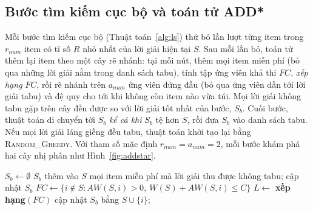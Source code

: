 \subsection{Bước tìm kiếm cục bộ và toán tử ADD*}

Mỗi bước tìm kiếm cục bộ (Thuật toán~\ref{alg:ls}) thử bỏ lần lượt từng item trong $r_{num}$ item có tỉ số $R$ nhỏ nhất của lời giải hiện tại $S$. Sau mỗi lần bỏ, toán tử \addstar thêm lại item theo một cây rẽ nhánh: tại mỗi nút, \addstar thêm mọi item miễn phí (bỏ qua những lời giải nằm trong danh sách tabu), tính tập ứng viên khả thi $FC$, \emph{xếp hạng} $FC$, rồi rẽ nhánh trên $a_{num}$ ứng viên đứng đầu (bỏ qua ứng viên dẫn tới lời giải tabu) và đệ quy cho tới khi không còn item nào vừa túi. Mọi lời giải không tabu gặp trên cây đều được so với lời giải tốt nhất của bước, $S_b$. Cuối bước, thuật toán di chuyển tới $S_b$ \emph{kể cả khi} $S_b$ tệ hơn $S$, rồi đưa $S_b$ vào danh sách tabu. Nếu mọi lời giải láng giềng đều tabu, thuật toán khởi tạo lại bằng \textsc{Random\_Greedy}. Với tham số mặc định $r_{num}=a_{num}=2$, mỗi bước khám phá hai cây nhị phân như Hình~\ref{fig:addstar}.

\begin{algorithm}[H]
\caption{Một bước tìm kiếm cục bộ của E2LS và toán tử \addstar}
\label{alg:ls}
\begin{algorithmic}[1]
  \State $S_b\leftarrow\emptyset$
    \State {}
  \EndFor
  \State \Return $S_b$ 
\EndFunction
\Statex
{}
  \State thêm vào $S$ mọi item miễn phí mà lời giải thu được không tabu; cập nhật $S_b$
  \State $FC\leftarrow\{i\notin S: AW(S,i)>0,\ W(S)+AW(S,i)\le C\}$
  \State $L\leftarrow$ \textbf{xếp hạng}$(FC)$ 
      \State cập nhật $S_b$ bằng $S\cup\{i\}$; 
    \EndIf
  \EndFor
\EndFunction
\end{algorithmic}
\end{algorithm}

